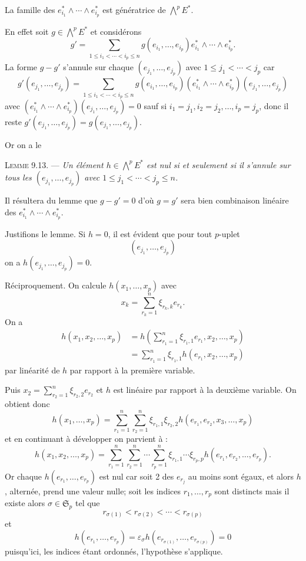 La famille des $e_{i_1}^*\wedge\cdots\wedge e_{i_p}^*$ est génératrice de $\bigwedge^pE^*$.

En effet soit $g\in\bigwedge^pE^*$ et considérons
\[
g'=\sum_{1\le i_1<\cdots<i_p\le n}g(e_{i_1},\ldots,e_{i_p})
 e_{i_1}^*\wedge\cdots\wedge e_{i_p}^*.
\]
La forme $g-g'$ s'annule sur chaque $(e_{j_1},\ldots,e_{j_p})$ avec $1\le j_1<\cdots<j_p$ car
\[
g'(e_{j_1},\ldots,e_{j_p})=
\sum_{1\le i_1<\cdots<i_p\le n}g(e_{i_1},\ldots,e_{i_p})
(e_{i_1}^*\wedge\cdots\wedge e_{i_p}^*)(e_{j_1},\ldots,e_{j_p})
\]
avec $(e_{i_1}^*\wedge\cdots\wedge e_{i_p}^*)(e_{j_1},\ldots,e_{j_p})=0$ sauf si $i_1=j_1,i_2=j_2,\ldots,i_p=j_p$, donc il reste $g'(e_{j_1},\ldots,e_{j_p})=g(e_{j_1},\ldots,e_{j_p})$.

Or on a le

\medskip\noindent\textsc{Lemme 9.13.} --- \emph{Un élément $h\in\bigwedge^pE^*$ est nul si et seulement si il s'annule sur tous les $(e_{j_1},\ldots,e_{j_p})$ avec $1\le j_1<\cdots<j_p\le n$.}

Il résultera du lemme que $g-g'=0$ d'où $g=g'$ sera bien combinaison linéaire des $e_{i_1}^*\wedge\cdots\wedge e_{i_p}^*$. \bookend

Justifions le lemme. Si $h=0$, il est évident que pour tout $p$-uplet
\[(e_{j_1},\ldots,e_{j_p})\]
on a $h(e_{j_1},\ldots,e_{j_p})=0$.

Réciproquement. On calcule $h(x_1,\ldots,x_p)$ avec
\[
x_k=\sum_{r_k=1}^n\xi_{r_k,k}e_{r_k}.
\]
On a
\begin{align*}
h(x_1,x_2,\ldots,x_p)
&=h\left(\sum_{r_1=1}^n\xi_{r_1,1}e_{r_1},x_2,\ldots,x_p\right)\\
&=\sum_{r_1=1}^n\xi_{r_1,1}h(e_{r_1},x_2,\ldots,x_p)
\end{align*}
par linéarité de $h$ par rapport à la première variable.

Puis $x_2=\sum_{r_2=1}^n\xi_{r_2,2}e_{r_2}$ et $h$ est linéaire par rapport à la deuxième variable. On obtient donc
\[
h(x_1,\ldots,x_p)=\sum_{r_1=1}^n\sum_{r_2=1}^n
\xi_{r_1,1}\xi_{r_2,2}h(e_{r_1},e_{r_2},x_3,\ldots,x_p)
\]
et en continuant à développer on parvient à :
\[
h(x_1,x_2,\ldots,x_p)=\sum_{r_1=1}^n\sum_{r_2=1}^n\cdots\sum_{r_p=1}^n
\xi_{r_1,1}\cdots\xi_{r_p,p}h(e_{r_1},e_{r_2},\ldots,e_{r_p}).
\]
Or chaque $h(e_{r_1},\ldots,e_{r_p})$ est nul car soit 2 des $e_{r_j}$ au moins sont égaux, et alors $h$, alternée, prend une valeur nulle; soit les indices $r_1,\ldots,r_p$ sont distincts mais il existe alors $\sigma\in\mathfrak S_p$ tel que
\[
r_{\sigma(1)}<r_{\sigma(2)}<\cdots<r_{\sigma(p)}
\]
et
\[
h(e_{r_1},\ldots,e_{r_p})=\varepsilon_\sigma h(e_{r_{\sigma(1)}},\ldots,e_{r_{\sigma(p)}})=0
\]
puisqu'ici, les indices étant ordonnés, l'hypothèse s'applique.

